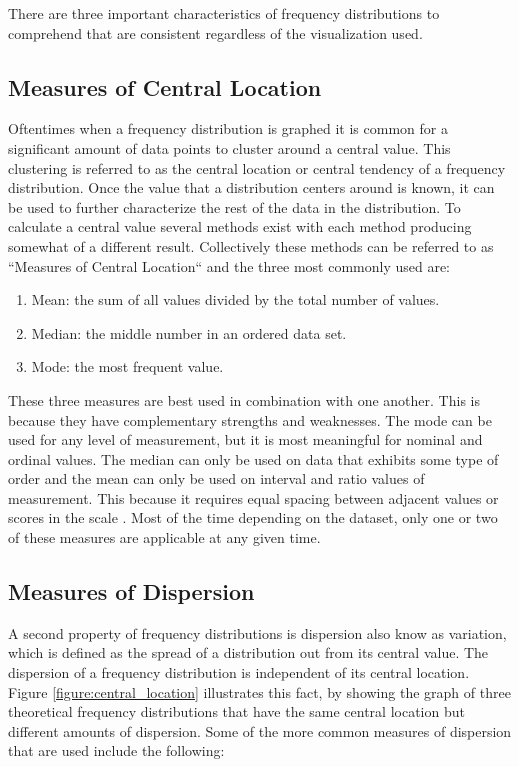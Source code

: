 
There are three important characteristics of frequency distributions to comprehend
that are consistent regardless of the visualization used.

\subsection{Measures of Central Location}

Oftentimes when a frequency distribution is graphed it is common for a significant
amount of data points to cluster around a central value. This clustering is referred to
as the central location or central tendency of a frequency distribution. Once the 
value that a distribution centers around is known, it can be used to further 
characterize the rest of the data in the distribution. To calculate a central value 
several methods exist with each method producing somewhat of a different result. 
Collectively these methods can be referred to as ``Measures of Central Location`` 
and the three most commonly used are:

\begin{enumerate}
    \item Mean: the sum of all values divided by the total number of values.
    \item Median: the middle number in an ordered data set.
    \item Mode: the most frequent value.
\end{enumerate}

These three measures are best used in combination with one another. This is because 
they have complementary strengths and weaknesses. The mode can be used for any 
level of measurement, but it is most meaningful for nominal and ordinal values.
The median can only be used on data that exhibits some type of order and the mean 
can only be used on interval and ratio values of measurement. This because it requires 
equal spacing between adjacent values or scores in the scale \cite{c12}. Most of 
the time depending on the dataset, only one or two of these measures are applicable 
at any given time.

\subsection{Measures of Dispersion}

A second property of frequency distributions is dispersion also know as variation, which 
is defined as the spread of a distribution out from its central value. The dispersion 
of a frequency distribution is independent of its central location. Figure \ref{figure:central_location} 
illustrates this fact, by showing the graph of three theoretical frequency distributions that have 
the same central location but different amounts of dispersion. Some of the more common
measures of dispersion that are used include the following:


